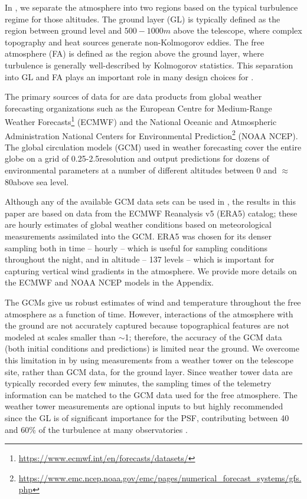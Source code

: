 \documentclass[twocolumn,twocolappendix]{openjournal}
\begin{document}
In \psfws, we separate the atmosphere into two regions based on the typical turbulence regime for those altitudes.
The ground layer (GL) is typically defined as the region between ground level and $500-1000\unit{m}$ above the telescope, where complex topography and heat sources generate non-Kolmogorov eddies.  
The free atmosphere (FA) is defined as the region above the ground layer, where turbulence is generally well-described by Kolmogorov statistics.
This separation into GL and FA plays an important role in many design choices for \psfws.

The primary sources of data for \psfws are data products from global weather forecasting organizations such as the European Centre for Medium-Range Weather Forecasts\footnote{\url{https://www.ecmwf.int/en/forecasts/datasets/}} (ECMWF) and the National Oceanic and Atmospheric Administration National Centers for Environmental Prediction\footnote{\url{https://www.emc.ncep.noaa.gov/emc/pages/numerical_forecast_systems/gfs.php}} (NOAA NCEP).
The global circulation models (GCM) used in weather forecasting cover the entire globe on a grid of 0.25-2.5\deg resolution and output predictions for dozens of environmental parameters at a number of different altitudes between 0 and $\approx$80\km above sea level.

Although any of the available GCM data sets can be used in \psfws, the results in this paper are based on data from the ECMWF Reanalysis v5 (ERA5) catalog; these are hourly estimates of global weather conditions based on meteorological measurements assimilated into the GCM.
ERA5 was chosen for its denser sampling both in time -- hourly -- which is useful for sampling conditions throughout the night, and in altitude -- 137 levels -- which is important for capturing vertical wind gradients in the atmosphere. 
We provide more details on the ECMWF and NOAA NCEP models in the Appendix.

The GCMs give us robust estimates of wind and temperature throughout the free atmosphere as a function of time. 
However, interactions of the atmosphere with the ground are not accurately captured because topographical features are not modeled at scales smaller than $\sim$1\km; 
therefore, the accuracy of the GCM data (both initial conditions and predictions) is limited near the ground.
We overcome this limitation in \psfws by using measurements from a weather tower on the telescope site, rather than GCM data, for the ground layer.
Since weather tower data are typically recorded every few minutes, the sampling times of the telemetry information can be matched to the GCM data used for the free atmosphere.
The weather tower measurements are optional inputs to \psfws but highly recommended since the GL is of significant importance for the PSF, contributing between 40 and 60\% of the turbulence at many observatories \citep{tokovinin_statistics_2003, tokovinin_model_2005, tokovinin_optical_2005}.
\end{document}
